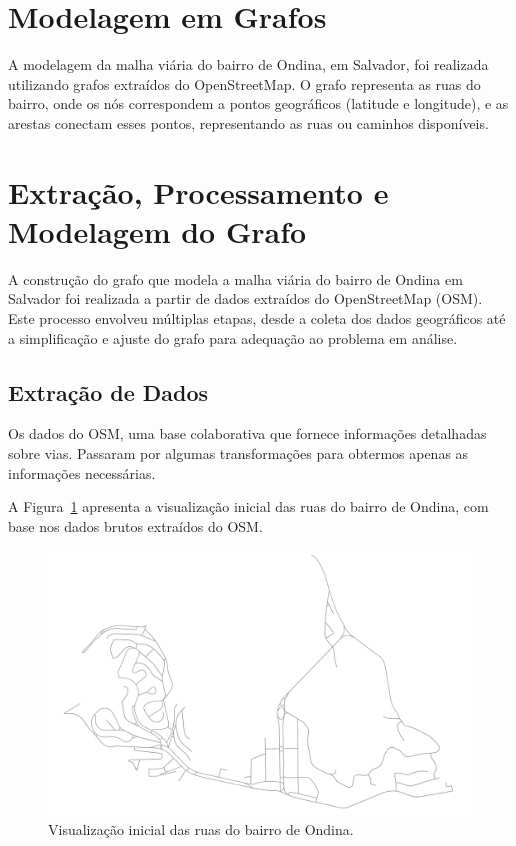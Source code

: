 \documentclass[12pt, a4paper]{report}
\begin{document}
\section{Modelagem em Grafos}

A modelagem da malha viária do bairro de Ondina, em Salvador, foi realizada utilizando grafos extraídos do OpenStreetMap. O grafo representa as ruas do bairro, onde os nós correspondem a pontos geográficos (latitude e longitude), e as arestas conectam esses pontos, representando as ruas ou caminhos disponíveis.

\section{Extração, Processamento e Modelagem do Grafo}

A construção do grafo que modela a malha viária do bairro de Ondina em Salvador foi realizada a partir de dados extraídos do OpenStreetMap (OSM). Este processo envolveu múltiplas etapas, desde a coleta dos dados geográficos até a simplificação e ajuste do grafo para adequação ao problema em análise.

\subsection{Extração de Dados}

Os dados do OSM, uma base colaborativa que fornece informações detalhadas sobre vias. Passaram por algumas transformações para obtermos apenas as informações necessárias.

A Figura~\ref{fig:ondina_ruas} apresenta a visualização inicial das ruas do bairro de Ondina, com base nos dados brutos extraídos do OSM.

\begin{figure}[H]
    \centering
    \includegraphics[width=\textwidth]{visualizacao_inicial}
    \caption{Visualização inicial das ruas do bairro de Ondina.}
    \label{fig:ondina_ruas}
\end{figure}
\end{document}
